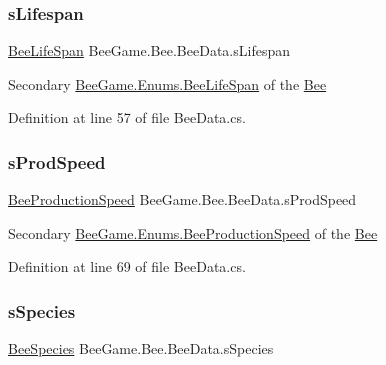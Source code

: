 \subsubsection{\texorpdfstring{s\+Lifespan}{sLifespan}}
{\footnotesize\ttfamily \hyperlink{namespace_bee_game_1_1_enums_ae3853807ded2f4d99a0d4a7fb4b2bc46}{Bee\+Life\+Span} Bee\+Game.\+Bee.\+Bee\+Data.\+s\+Lifespan}



Secondary \hyperlink{namespace_bee_game_1_1_enums_ae3853807ded2f4d99a0d4a7fb4b2bc46}{Bee\+Game.\+Enums.\+Bee\+Life\+Span} of the \hyperlink{namespace_bee_game_1_1_bee}{Bee} 



Definition at line 57 of file Bee\+Data.\+cs.

\mbox{\label{struct_bee_game_1_1_bee_1_1_bee_data_af2e94ee206fd06b8314888f8ba3d56e9}} 
\subsubsection{\texorpdfstring{s\+Prod\+Speed}{sProdSpeed}}
{\footnotesize\ttfamily \hyperlink{namespace_bee_game_1_1_enums_afee18200a21cc4b8e1d0cdb669930f14}{Bee\+Production\+Speed} Bee\+Game.\+Bee.\+Bee\+Data.\+s\+Prod\+Speed}



Secondary \hyperlink{namespace_bee_game_1_1_enums_afee18200a21cc4b8e1d0cdb669930f14}{Bee\+Game.\+Enums.\+Bee\+Production\+Speed} of the \hyperlink{namespace_bee_game_1_1_bee}{Bee} 



Definition at line 69 of file Bee\+Data.\+cs.

\mbox{\label{struct_bee_game_1_1_bee_1_1_bee_data_add33b8a3084a342ad7176a9366c2fc55}} 
\subsubsection{\texorpdfstring{s\+Species}{sSpecies}}
{\footnotesize\ttfamily \hyperlink{namespace_bee_game_1_1_enums_aa2ead984825678d83c42d48f6382619c}{Bee\+Species} Bee\+Game.\+Bee.\+Bee\+Data.\+s\+Species}



